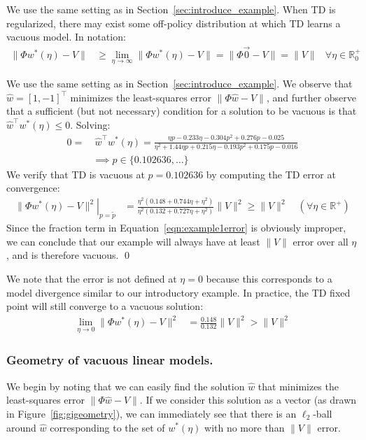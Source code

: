 \begin{example}
  \label{ex:withrr}
  We use the same setting as in Section~\ref{sec:introduce_example}.
  When TD is regularized, there may exist some off-policy distribution at which TD learns a vacuous model. In notation:
  \begin{align}
    \|\Phi w^*(\eta) - V\| & \geq \lim_{\eta\to\infty} \|\Phi w^*(\eta) - V \| = \|\Phi \vec 0 - V \| = \|V \| & \forall \eta\in\mathbb{R}_0^+ \label{eqn:vacuoustd}
  \end{align}

  \proof We use the same setting as in Section~\ref{sec:introduce_example}.
  We observe that $\hat w = [1, -1]^\top$ minimizes the least-squares error $\|\Phi \hat w - V\|$, and further observe that a sufficient (but not necessary) condition for a solution to be vacuous is that $\hat w^\top w^*(\eta) \leq 0$. Solving:
  \begin{align}
    0= & ~ \hat w^\top w^*(\eta) =
    \frac{\eta p-0.233 \eta-0.304 p^2+0.276 p-0.025}{\eta^2+1.44 \eta p+0.215 \eta-0.193 p^2+0.175 p-0.016}
    \\ & \implies p \in \{0.102636, \ldots\}
  \end{align}
  We verify that TD is vacuous at $p=0.102636$ by computing the TD error at convergence:
  \begin{align}
    \left. \|\Phi w^*(\eta) - V\|^2 \right|_{p=\tilde p} & =
    \frac{\eta^2 (0.148 + 0.744 \eta + \eta^2)}{ \eta^2 (0.132 + 0.727 \eta + \eta^2)} \|V\|^2 \geq \|V\|^2\quad(\forall \eta \in \mathbb R^+) \label{eqn:example1error}
  \end{align}
  Since the fraction term in Equation~\ref{eqn:example1error} is obviously improper, we can conclude that our example will always have at least $\|V\|$ error over all $\eta$, and is therefore vacuous. \qed
\end{example}
We note that the error is not defined at $\eta=0$ because this corresponds to a model divergence similar to our introductory example. In practice, the TD fixed point will still converge to a vacuous solution:
\begin{align}
  \lim_{\eta\to 0} \|\Phi w^*(\eta) - V\|^2 & = \frac{0.148}{0.132} \|V\|^2 > \|V\|^2
\end{align}

\subsubsection{Geometry of vacuous linear models. }
We begin by noting that we can easily find the solution $\hat w$ that minimizes the least-squares error $\|\Phi \hat w - V\|$. If we consider this solution as a vector (as drawn in Figure~\ref*{fig:gigeometry}), we can immediately see that there is an $\ell_2$-ball around $\hat w$ corresponding to the set of $w^*(\eta)$ with no more than $\|V\|$ error.

